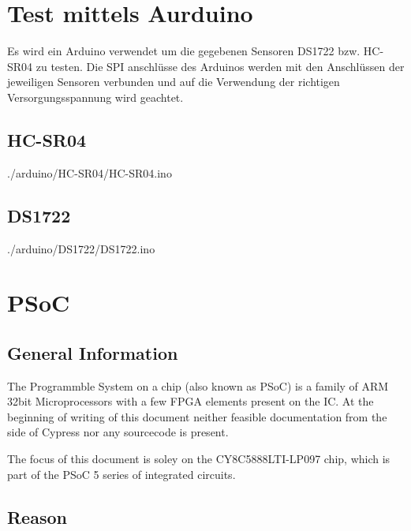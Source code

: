 \documentclass[12pt,a4paper]{article}
\def\psocdisasm{0}
\begin{document}
\section{Test mittels Aurduino}

Es wird ein Arduino verwendet um die gegebenen Sensoren DS1722 bzw. HC-SR04 zu 
testen. Die SPI anschlüsse des Arduinos werden mit den Anschlüssen der
jeweiligen Sensoren verbunden und auf die Verwendung der richtigen 
Versorgungsspannung wird geachtet.

\newpage
\subsection{HC-SR04}


 {./arduino/HC-SR04/HC-SR04.ino}

\newpage
\subsection{DS1722}


 {./arduino/DS1722/DS1722.ino}

\if\psocdisasm

\section{PSoC}

\subsection{General Information}

The Programmble System on a chip (also known as PSoC) is a family of ARM 32bit
Microprocessors with a few FPGA elements present on the IC. At the beginning of
writing of this document neither feasible documentation from the side of Cypress
nor any sourcecode is present.

The focus of this document is soley on the CY8C5888LTI-LP097 chip, which is part
of the PSoC 5 series of integrated circuits.

\subsection{Reason}
\end{document}
